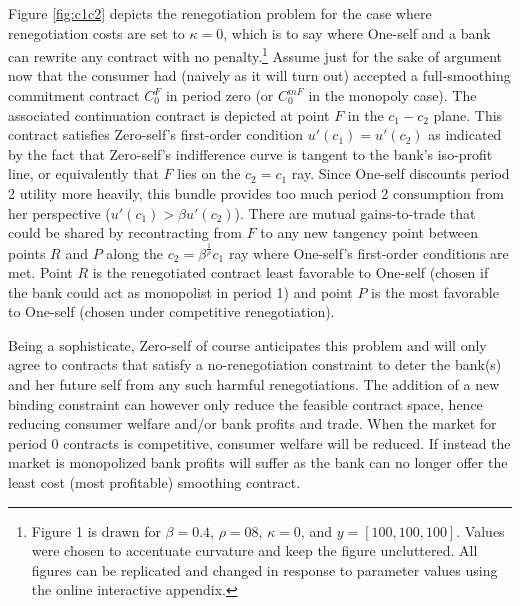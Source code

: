 \documentclass[11pt,english]{article}
\theoremstyle{plain}
\theoremstyle{definition}
\begin{document}
Figure \ref{fig:c1c2} depicts the renegotiation problem for the case where renegotiation costs are
set to $\kappa=0$, which is to say where One-self and a bank can rewrite
any contract with no penalty.\footnote{Figure 1 is drawn for  $\beta=0.4$, $\rho=08$, $\kappa=0$, and $y= [100, 100, 100]$.  Values were chosen to accentuate curvature and keep the figure uncluttered.  All figures can be replicated and changed in response to parameter values using the online interactive appendix.} Assume \textendash{} just for the sake
of argument now \textendash{} that the consumer had (naively as it
will turn out) accepted a full-smoothing commitment contract $C_{0}^{F}$
in period zero (or $C_{0}^{mF}$ in the monopoly case). The associated
continuation contract is depicted at point $F$ in the $c_{1}-c_{2}$
plane. This contract satisfies Zero-self's first-order condition $u'(c_{1})=u'(c_{2})$
as indicated by the fact that Zero-self's indifference curve is tangent
to the bank's iso-profit line, or equivalently that \(F\) lies on the \(c_2=c_1\) ray. Since One-self discounts period 2 utility
more heavily, this bundle provides too much period 2 consumption from her perspective ($u'(c_{1})>\beta u'(c_{2})$). There are mutual gains-to-trade that could be shared by recontracting
from $F$ to any new tangency point between points \(R\) and \(P\) along the $c_{2}=\beta^{\frac{1}{\rho}}c_{1}$
ray where One-self's first-order conditions are met. Point
$R$ is the renegotiated contract least favorable to One-self
(chosen if the bank could act as monopolist in period 1) and point
$P$ is the most favorable to One-self
(chosen under competitive renegotiation).


Being a sophisticate, Zero-self of course anticipates this problem and will only agree to contracts that satisfy a no-renegotiation constraint
to deter the bank(s) and her future self from any such harmful renegotiations. The addition of a new binding constraint can however only reduce the feasible contract space, hence reducing
consumer welfare and/or bank profits and trade. When the market for
period 0 contracts is competitive, consumer welfare will be reduced.
If instead the market is monopolized bank profits will suffer as the
bank can no longer offer the least cost (most profitable) smoothing
contract.
\end{document}

